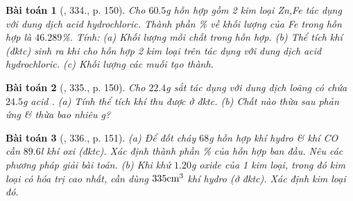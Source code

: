 \documentclass{article}
\newtheorem{baitoan}{Bài toán}
\begin{document}
\begin{baitoan}[\cite{An_400_BT_Hoa_Hoc_8_2020}, 334., p. 150]
	Cho $60.5$\emph{g} hỗn hợp gồm 2 kim loại \emph{Zn,Fe} tác dụng với dung dịch acid hydrochloric. Thành phần \% về khối lượng của \emph{Fe} trong hỗn hợp là $46.289$\%. Tính: (a) Khối lượng mỗi chất trong hỗn hợp. (b) Thể tích khí \emph{} (đktc) sinh ra khi cho hỗn hợp 2 kim loại trên tác dụng với dung dịch acid hydrochloric. (c) Khối lượng các muối tạo thành.
\end{baitoan}

\begin{baitoan}[\cite{An_400_BT_Hoa_Hoc_8_2020}, 335., p. 150]
	Cho $22.4$\emph{g} sắt tác dụng với dung dịch loãng có chứa $24.5$\emph{g} acid \emph{}. (a) Tính thể tích khí \emph{} thu được ở đktc. (b) Chất nào thừa sau phản ứng \& thừa bao nhiêu \emph{g}?	
\end{baitoan}

\begin{baitoan}[\cite{An_400_BT_Hoa_Hoc_8_2020}, 336., p. 151]
	(a) Để đốt cháy $68$\emph{g} hỗn hợp khí hydro \& khí \emph{CO} cần $89.6$\emph{l} khí oxi (đktc). Xác định thành phần \% của hỗn hợp ban đầu. Nêu các phương pháp giải bài toán. (b) Khi khử $1.20$\emph{g} oxide của 1 kim loại, trong đó kim loại có hóa trị cao nhất, cần dùng $\rm335cm^3$ khí hydro (ở đktc). Xác định kim loại đó.
\end{baitoan}


\printbibliography[heading=bibintoc]
	
\end{document}
